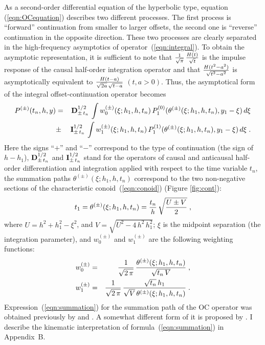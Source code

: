 As a second-order differential equation of the hyperbolic type,
equation (\ref{eqn:OCequation}) describes two different processes. The
first process is ``forward'' continuation from smaller to larger
offsets, the second one is ``reverse'' continuation in the opposite
direction.  These two processes are clearly separated in the
high-frequency asymptotics of operator~(\ref{eqn:integral}). To obtain
the asymptotic representation, it is sufficient to note that ${1
  \over \sqrt{\pi}}\, {H(t) \over \sqrt{t}}$ is the impulse response
of the causal half-order integration operator and that $H(t^2-a^2)
\over \sqrt{t^2-a^2}$ is asymptotically equivalent to $H(t-a) \over
{\sqrt{2a}\,\sqrt{t-a}}$ $(t, a >0)$.  Thus, the asymptotical form of
the integral offset-continuation operator becomes
\begin{eqnarray}
P^{(\pm)}(t_n,h,y) & = &
{\bf D}^{1/2}_{\pm\,t_n}\,\int w^{(\pm)}_0(\xi;h_1,h,t_n)\,
P^{(0)}_1(\theta^{(\pm)}(\xi;h_1,h,t_n),y_1-\xi)\,d\xi
\nonumber \\ 
& \pm  & 
{\bf I}^{1/2}_{\pm\,t_n}\,\int w^{(\pm)}_1(\xi;h_1,h,t_n)\,
P^{(1)}_1(\theta^{(\pm)}(\xi;h_1,h,t_n),y_1-\xi)\,d\xi\;.
\label{eqn:asintegral} 
\end{eqnarray}
Here the signs ``$+$'' and ``$-$'' correspond to the type of
continuation (the sign of ${h-h_1}$), ${\bf D}^{1/2}_{\pm\,t_n}$ and
${\bf I}^{1/2}_{\pm\,t_n}$ stand for the operators of causal and
anticausal half-order differentiation and integration applied with
respect to the time variable $t_n$, the summation paths
$\theta^{(\pm)}(\xi;h_1,h,t_n)$ correspond to the two non-negative
sections of the characteristic conoid~(\ref{eqn:conoid}) (Figure
\ref{fig:cont}):
\begin{equation}
t_1=\theta^{(\pm)}(\xi;h_1,h,t_n)=
{t_n \over h}\,\sqrt{{U \pm V} \over 2 }\;,
\label{eqn:summation}
\end{equation}
where $U=h^2+h_1^2-\xi^2$, and $V=\sqrt{U^2-4\,h^2\,h_1^2}$; $\xi$ is
the midpoint separation (the integration parameter), and $w^{(\pm)}_0$
and $w^{(\pm)}_1$ are the following weighting functions:
\begin{eqnarray}
w^{(\pm)}_0 & = & {1 \over \sqrt{2\,\pi}}\,
{\theta^{(\pm)}(\xi;h_1,h,t_n) \over \sqrt{t_n\,V}}\;,
\label{eqn:w0} \\
w^{(\pm)}_1 & = & {1 \over \sqrt{2\,\pi}}\,
{{\sqrt{t_n}\, h_1} \over {\sqrt{V}\,\theta^{(\pm)}(\xi;h_1,h,t_n)}}\;. 
\label{eqn:w1} 
\end{eqnarray}  
Expression~(\ref{eqn:summation}) for the summation path of the OC
operator was obtained previously by \cite{stovas} and
\cite{SEG-1994-1541}. A somewhat different form of it is proposed by
\cite{GEO61-06-18461858}. I describe the kinematic interpretation
of formula~(\ref{eqn:summation}) in Appendix~B.


